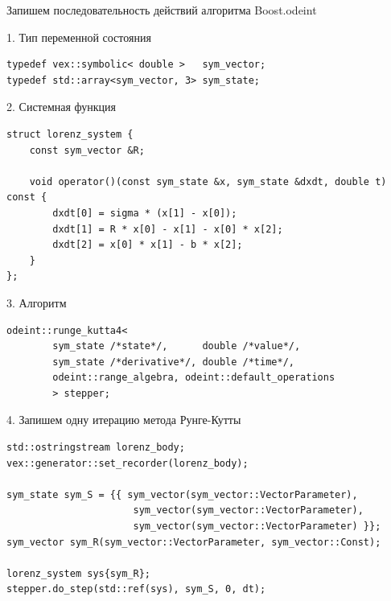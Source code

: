 \documentclass[@BEAMER_OPTIONS@]{beamer}
\begin{document}
\begin{frame}[fragile]{Запишем последовательность действий алгоритма
    Boost.odeint}
    \begin{exampleblock}{1. Тип переменной состояния}
        \begin{lstlisting}
typedef vex::symbolic< double >   sym_vector;
typedef std::array<sym_vector, 3> sym_state;
        \end{lstlisting}
    \end{exampleblock}

    \begin{exampleblock}{2. Системная функция}
        \begin{lstlisting}[firstnumber=last]
struct lorenz_system {
    const sym_vector &R;

    void operator()(const sym_state &x, sym_state &dxdt, double t) const {
        dxdt[0] = sigma * (x[1] - x[0]);
        dxdt[1] = R * x[0] - x[1] - x[0] * x[2];
        dxdt[2] = x[0] * x[1] - b * x[2];
    }
};
        \end{lstlisting}
    \end{exampleblock}
\end{frame}


\begin{frame}[fragile]{}
    \begin{exampleblock}{3. Алгоритм}
        \begin{lstlisting}[firstnumber=last]
odeint::runge_kutta4<
        sym_state /*state*/,      double /*value*/,
        sym_state /*derivative*/, double /*time*/,
        odeint::range_algebra, odeint::default_operations
        > stepper;
        \end{lstlisting}
    \end{exampleblock}

    \begin{exampleblock}{4. Запишем одну итерацию метода Рунге-Кутты}
        \begin{lstlisting}[firstnumber=last]
std::ostringstream lorenz_body;
vex::generator::set_recorder(lorenz_body);

sym_state sym_S = {{ sym_vector(sym_vector::VectorParameter),
                      sym_vector(sym_vector::VectorParameter),
                      sym_vector(sym_vector::VectorParameter) }};
sym_vector sym_R(sym_vector::VectorParameter, sym_vector::Const);

lorenz_system sys{sym_R};
stepper.do_step(std::ref(sys), sym_S, 0, dt);
        \end{lstlisting}
    \end{exampleblock}
\end{frame}
\end{document}
